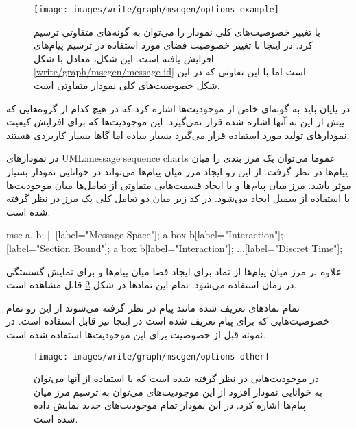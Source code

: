 \begin{figure}[h]
\centering
\texttt{[image: images/write/graph/mscgen/options-example]}
\caption[تعیین شناسه برای پیام‌ها]{
	با تغییر خصوصیت‌های کلی نمودار را می‌توان به گونه‌های متفاوتی ترسیم کرد. در
	اینجا با تغییر خصوصیت  فضای مورد استفاده در ترسیم پیام‌های
	افزایش یافته است. این شکل، معادل با شکل \ref{write/graph/mscgen/message-id}
	است اما با این تفاوتی که در این شکل خصوصیت‌های کلی نمودار متفاوتی است.
	}
\label{write/graph/mscgen/options-example}
\end{figure}

در پایان باید به گونه‌ای خاص از موجودیت‌ها اشاره کرد که در هیچ کدام از گروه‌هایی
که پیش از این به آنها اشاره شده قرار نمی‌گیرد. این موجودیت‌ها که برای افزایش
کیفیت نمودارهای تولید مورد استفاده قرار می‌گیرد بسیار ساده اما گاها بسیار
کاربردی هستند.

در نمودارهای \glspl{UML:message sequence chart} عموما می‌توان یک مرز بندی را
میان پیام‌ها در نظر گرفت. از این رو ایجاد مرز میان پیام‌ها می‌تواند در خوانایی
نمودار بسیار موثر باشد. مرز میان پیام‌ها و یا ایجاد قسمت‌هایی متفاوتی
از تعامل‌ها میان موجودیت‌ها با استفاده از سمبل \lr{---} ایجاد می‌شود. در کد
زیر میان دو تعامل کلی یک مرز در نظر گرفته شده است.

\begin{MSC}
msc {
	a, b;
	|||[label="Message Space"];
	a box b[label="Interaction"];
	---[label="Section Bound"];
	a box b[label="Interaction"];
	...[label="Discret Time"];
}
\end{MSC}

علاوه بر مرز میان پیام‌ها از نماد \lr{|||} برای ایجاد فضا میان پیام‌ها و
\lr{\ldots} برای نمایش گسستگی در زمان استفاده می‌شود. تمام این نمادها در شکل
\ref{write/graph/mscgen/options-other} قابل مشاهده است.

\begin{note}
تمام نمادهای تعریف شده مانند پیام در نظر گرفته می‌شوند از این رو تمام
خصوصیت‌هایی که برای پیام تعریف شده است در اینجا نیز قابل استفاده است. در نمونه
قبل از خصوصیت  برای این موجودیت‌ها استفاده شده است.
\end{note}


\begin{figure}
\centering
\texttt{[image: images/write/graph/mscgen/options-other]}
\caption[تعیین شناسه برای پیام‌ها]{
	در  موجودیت‌هایی در نظر گرفته شده است که با استفاده  از آنها
	می‌توان به خوانایی نمودار افزود از این موجودیت‌های می‌توان به ترسیم مرز میان
	پیام‌ها اشاره کرد. در این نمودار تمام موجودیت‌های جدید نمایش داده شده است.
	}
\label{write/graph/mscgen/options-other}
\end{figure}